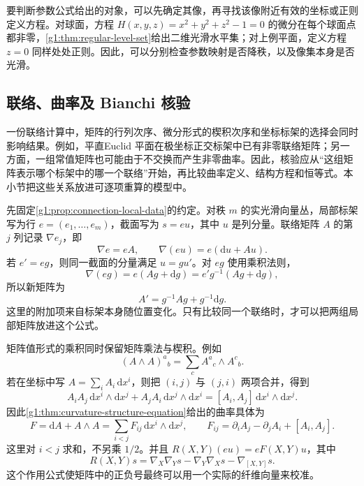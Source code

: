 要判断参数公式给出的对象，可以先确定其像，再寻找该像附近有效的坐标或正则定义方程。对球面，方程 \(H(x,y,z)=x^2+y^2+z^2-1=0\) 的微分在每个球面点都非零，\cref{g1:thm:regular-level-set}给出二维光滑水平集；对上例平面，定义方程 \(z=0\) 同样处处正则。因此，可以分别检查参数映射是否降秩，以及像集本身是否光滑。

\subsection{联络、曲率及 Bianchi 核验}
\label{g1:subsec:C01:02}

一份联络计算中，矩阵的行列次序、微分形式的楔积次序和坐标标架的选择会同时影响结果。例如，平直Euclid 平面在极坐标正交标架中已有非零联络矩阵；另一方面，一组常值矩阵也可能由于不交换而产生非零曲率。因此，核验应从“这组矩阵表示哪个标架中的哪一个联络”开始，再比较曲率定义、结构方程和恒等式。本小节把这些关系放进可逐项重算的模型中。

\ProseParagraphBreak

先固定\cref{g1:prop:connection-local-data}的约定。对秩 \(m\) 的实光滑向量丛，局部标架写为行 \(e=(e_1,\ldots,e_m)\)，截面写为 \(s=eu\)，其中 \(u\) 是列分量。联络矩阵 \(A\) 的第 \(j\) 列记录 \(\nabla e_j\)，即
\[
	\nabla e=eA,\qquad \nabla(eu)=e(\mathrm{d}u+Au).
\]
若 \(e'=eg\)，则同一截面的分量满足 \(u=gu'\)。对 \(eg\) 使用乘积法则，
\[
	\nabla(eg)=e(Ag+\mathrm{d}g)
	=e'g^{-1}(Ag+\mathrm{d}g),
\]
所以新矩阵为
\[
	A'=g^{-1}Ag+g^{-1}\mathrm{d}g.
\]
这里的附加项来自标架本身随位置变化。只有比较同一个联络时，才可以把两组局部矩阵放进这个公式。

\ProseParagraphBreak

矩阵值形式的乘积同时保留矩阵乘法与楔积。例如
\[
	(A\wedge A)^a{}_b=\sum_c A^a{}_c\wedge A^c{}_b.
\]
若在坐标中写 \(A=\sum_i A_i\,\mathrm{d}x^i\)，则把 \((i,j)\) 与 \((j,i)\) 两项合并，得到
\[
	A_iA_j\,\mathrm{d}x^i\wedge\mathrm{d}x^j
	+A_jA_i\,\mathrm{d}x^j\wedge\mathrm{d}x^i
	=[A_i,A_j]\,\mathrm{d}x^i\wedge\mathrm{d}x^j.
\]
因此\cref{g1:thm:curvature-structure-equation}给出的曲率具体为
\begin{equation}\label{g1:eq:connection-check-curvature-components}
	F=\mathrm{d}A+A\wedge A
	=\sum_{i<j}F_{ij}\,\mathrm{d}x^i\wedge\mathrm{d}x^j,
	\qquad F_{ij}=\partial_iA_j-\partial_jA_i+[A_i,A_j].
\end{equation}
这里对 \(i<j\) 求和，不另乘 \(1/2\)。并且 \(R(X,Y)(eu)=eF(X,Y)u\)，其中
\[
	R(X,Y)s=\nabla_X\nabla_Ys-\nabla_Y\nabla_Xs-\nabla_{[X,Y]}s.
\]
这个作用公式使矩阵中的正负号最终可以用一个实际的纤维向量来校准。

